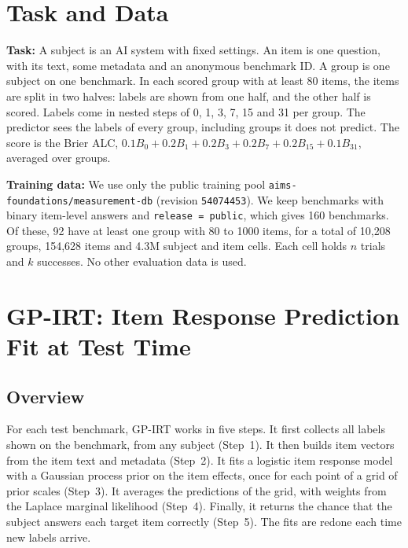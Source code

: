 \documentclass{article}
\begin{document}
\section{Task and Data}
\textbf{Task:} A subject is an AI system with fixed settings. An item is one question, with its text, some metadata
and an anonymous benchmark ID. A group is one subject on one benchmark. In each scored group with at least 80 items,
the items are split in two halves: labels are shown from one half, and the other half is scored. Labels come in nested
steps of 0, 1, 3, 7, 15 and 31 per group. The predictor sees the labels of every group, including groups it does not
predict. The score is the Brier ALC, $0.1B_0+0.2B_1+0.2B_3+0.2B_7+0.2B_{15}+0.1B_{31}$, averaged over groups.

\textbf{Training data:} We use only the public training pool \texttt{aims-foundations/measurement-db} (revision
\texttt{54074453}). We keep benchmarks with binary item-level answers and \texttt{release = public}, which gives 160
benchmarks. Of these, 92 have at least one group with 80 to 1000 items, for a total of 10{,}208 groups, 154{,}628
items and 4.3M subject and item cells. Each cell holds $n$ trials and $k$ successes. No other evaluation data is used.

\section{GP-IRT: Item Response Prediction Fit at Test Time}
\subsection{Overview}
For each test benchmark, GP-IRT works in five steps. It first collects all labels shown on the benchmark, from any
subject (Step~1). It then builds item vectors from the item text and metadata (Step~2). It fits a logistic item
response model with a Gaussian process prior on the item effects, once for each point of a grid of prior scales
(Step~3). It averages the predictions of the grid, with weights from the Laplace marginal likelihood (Step~4).
Finally, it returns the chance that the subject answers each target item correctly (Step~5). The fits are redone each
time new labels arrive.
\end{document}
